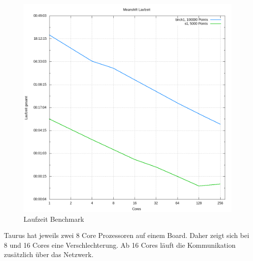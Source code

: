 	\begin{figure}[H]
		\centering
		\includegraphics[scale=0.61]{../meanshift/output/pics/benchmark.png} 
		\caption{Laufzeit Benchmark}
	\end{figure}
	Taurus hat jeweils zwei 8 Core Prozessoren auf einem Board. Daher zeigt sich bei 8 und 16 Cores eine Verschlechterung. 
	Ab 16 Cores läuft die Kommunikation zusätzlich über das Netzwerk.\\
	\newpage
